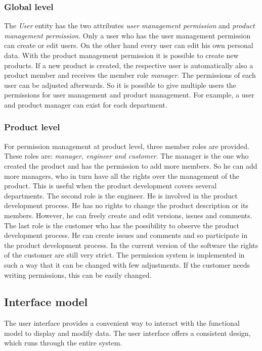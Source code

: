     \subsubsection*{Global level}
    The \textit{User} entity has the two attributes \textit{user management permission} and \textit{product management permission}. Only a user who has the user management permission can create or edit users. On the other hand every user can edit his own personal data. With the product management permission it is possible to create new products. If a new product is created, the respective user is automatically also a product member and receives the member role \textit{manager}. The permissions of each user can be adjusted afterwards. So it is possible to give multiple users the permissions for user management and product management. For example, a user and product manager can exist for each department. 

    \subsubsection*{Product level}
    For permission management at product level, three member roles are provided. These roles are: \textit{manager, engineer and customer}. The manager is the one who created the product and has the permission to add more members. So he can add more managers, who in turn have all the rights over the management of the product. This is useful when the product development covers several departments. The second role is the engineer. He is involved in the product development process. He has no rights to change the product description or its members. However, he can freely create and edit versions, issues and comments. The last role is the customer who has the possibility to observe the product development process. He can create issues and comments and so participate in the product development process. In the current version of the software the rights of the customer are still very strict. The permission system is implemented in such a way that it can be changed with few adjustments. If the customer needs writing permissions, this can be easily changed.
    
    \subsection*{Interface model} 
    The user interface provides a convenient way to interact with the functional model to display and modify data. The user interface offers a consistent design, which runs through the entire system.

